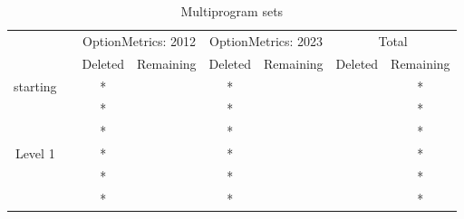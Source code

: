 \begin{table}
    \centering
    \caption{Multiprogram sets}
    \label{multiprogram}
    \begin{tabular}{c c c c c c c c }
       
        
         \multicolumn{1}{c}{} &  \multicolumn{1}{c}{} & \multicolumn{2}{c}{OptionMetrics: 2012} & \multicolumn{2}{c}{OptionMetrics: 2023} & \multicolumn{2}{c}{Total} \\
         \cline{3-4}
                  
         \cline{5-6}
         \cline{7-8}
         
          &  & Deleted & Remaining & Deleted & Remaining & Deleted & Remaining \\

       \hline
       starting & & * &  & * &  &  & * \\
       & & * &  & * &  &  & * \\
       & & * &  & * &  &  & * \\
        \hline
        Level 1 & & * &  & * &  &  & * \\
       & & * &  & * &  &  & * \\
       & & * &  & * &  &  & * \\ 
        \hline
    \end{tabular}
\end{table}



